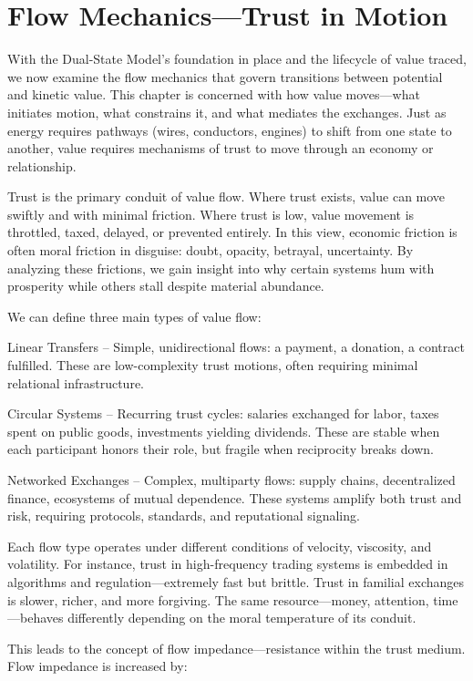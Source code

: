 \documentclass[11pt,oneside]{book}
\begin{document}
\section{Flow Mechanics—Trust in Motion}

With the Dual-State Model’s foundation in place and the lifecycle of value traced, we now examine the flow mechanics that govern transitions between potential and kinetic value. This chapter is concerned with how value moves—what initiates motion, what constrains it, and what mediates the exchanges. Just as energy requires pathways (wires, conductors, engines) to shift from one state to another, value requires mechanisms of trust to move through an economy or relationship.

Trust is the primary conduit of value flow. Where trust exists, value can move swiftly and with minimal friction. Where trust is low, value movement is throttled, taxed, delayed, or prevented entirely. In this view, economic friction is often moral friction in disguise: doubt, opacity, betrayal, uncertainty. By analyzing these frictions, we gain insight into why certain systems hum with prosperity while others stall despite material abundance.

We can define three main types of value flow:

    Linear Transfers – Simple, unidirectional flows: a payment, a donation, a contract fulfilled. These are low-complexity trust motions, often requiring minimal relational infrastructure.

    Circular Systems – Recurring trust cycles: salaries exchanged for labor, taxes spent on public goods, investments yielding dividends. These are stable when each participant honors their role, but fragile when reciprocity breaks down.

    Networked Exchanges – Complex, multiparty flows: supply chains, decentralized finance, ecosystems of mutual dependence. These systems amplify both trust and risk, requiring protocols, standards, and reputational signaling.

Each flow type operates under different conditions of velocity, viscosity, and volatility. For instance, trust in high-frequency trading systems is embedded in algorithms and regulation—extremely fast but brittle. Trust in familial exchanges is slower, richer, and more forgiving. The same resource—money, attention, time—behaves differently depending on the moral temperature of its conduit.

This leads to the concept of flow impedance—resistance within the trust medium. Flow impedance is increased by:
\end{document}
